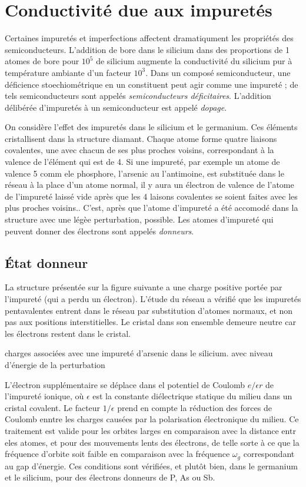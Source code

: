 \chapter{Conductivité due aux impuretés}

Certaines impuretés et imperfections affectent dramatiqument les propriétés des
semiconducteurs. L'addition de bore dans le silicium dans des proportions de 1
atomes de bore pour $10^5$ de silicium augmente la conductivité du silicium pur à
température ambiante d'un facteur $10^3$. Dans un composé semiconducteur, une
déficience stoechiométrique en un constituent peut agir comme une impureté ; de
tels semiconducteurs sont appelés \emph{semiconducteurs déficitaires}. L'addition
délibérée d'impuretés à un semiconducteur est appelé \emph{dopage}.

On considère l'effet des impuretés dans le silicium et le germanium. Ces éléments
cristallisent dans la structure diamant. Chaque atome forme quatre liaisons
covalentes, une avec chacun de ses plus proches voisins, correspondant à la
valence de l'élément qui est de 4. Si une impureté, par exemple un atome de
valence 5 comm ele phosphore, l'arsenic au l'antimoine, est substituée dans le
réseau à la place d'un atome normal, il y aura un électron de valence de l'atome
de l'impureté laissé vide après que les 4 laisons covalentes se soient faites
avec les plus proches voisins.. C'est, après que l'atome d'impureté a été
accomodé dans la structure avec une légèe perturbation, possible. Les atomes
d'impureté qui peuvent donner des électrons sont appelés \emph{donneurs}.

\section{État donneur}
La structure présentée sur la figure suivante a une charge positive portée par
l'impureté (qui a perdu un électron). L'étude du réseau a vérifié que les
impuretés pentavalentes entrent dans le réseau par substitution d'atomes normaux,
et non pas aux positions interstitielles. Le cristal dans son ensemble demeure
neutre car les électrons restent dans le cristal.

\begin{marginfigure}
    \TODO
    \caption{charges associées avec une impureté d'arsenic dans le silicium. avec
    niveau d'énergie de la perturbation}
\end{marginfigure}

L'électron supplémentaire se déplace dans el potentiel de Coulomb $e/\epsilon r$
de l'impureté ionique, où $\epsilon$ est la constante diélectrique statique du
milieu dans un cristal covalent. Le facteur $1/\epsilon$ prend en compte la
réduction des forces de Coulomb enntre les charges causées par la polarisation
électronique du milieu. Ce traitement est valide pour les orbites larges en
comparaison avec la distance entr eles atomes, et pour des mouvements lents des
électrons, de telle sorte à ce que la fréquence d'orbite soit faible en
comparaison avec la fréquence $\omega_g$ correspondant au gap d'énergie. Ces
conditions sont vérifiées, et plutôt bien, dans le germanium et le silicium, pour
des électrons donneurs de P, As ou Sb.

